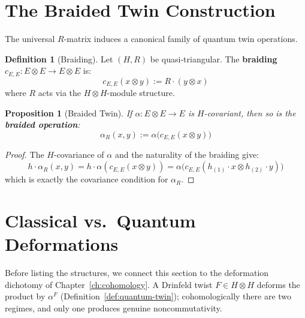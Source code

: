 \documentclass[11pt,a4paper,openany]{book}
\theoremstyle{plain}
\newtheorem{proposition}[theorem]{Proposition}
\theoremstyle{definition}
\newtheorem{definition}[theorem]{Definition}
\newcommand{\actspace}{E}
\begin{document}
\section{The Braided Twin Construction}

The universal $R$-matrix induces a canonical family of quantum twin operations.

\begin{definition}[Braiding]\label{def:braiding}
Let $(H, R)$ be quasi-triangular. The \textbf{braiding} $c_{\actspace,\actspace} : \actspace \otimes \actspace \to \actspace \otimes \actspace$ is:
\[
c_{\actspace,\actspace}(x \otimes y) := R \cdot (y \otimes x)
\]
where $R$ acts via the $H \otimes H$-module structure.
\end{definition}

\begin{proposition}[Braided Twin]\label{prop:braided-twin}
If $\alpha : \actspace \otimes \actspace \to \actspace$ is $H$-covariant, then so is the \textbf{braided operation}:
\[
\alpha_R(x, y) := \alpha\big(c_{\actspace,\actspace}(x \otimes y)\big)
\]
\end{proposition}

\begin{proof}
The $H$-covariance of $\alpha$ and the naturality of the braiding give:
\[
h \cdot \alpha_R(x, y) = h \cdot \alpha(c_{\actspace,\actspace}(x \otimes y)) = \alpha\big(c_{\actspace,\actspace}(h_{(1)} \cdot x \otimes h_{(2)} \cdot y)\big)
\]
which is exactly the covariance condition for $\alpha_R$.
\end{proof}

\section{Classical vs.\ Quantum Deformations}

Before listing the structures, we connect this section to the deformation dichotomy of Chapter~\ref{ch:cohomology}. A Drinfeld twist $F \in H \otimes H$ deforms the product by $\alpha^F$ (Definition~\ref{def:quantum-twin}); cohomologically there are two regimes, and only one produces genuine noncommutativity.
\end{document}

